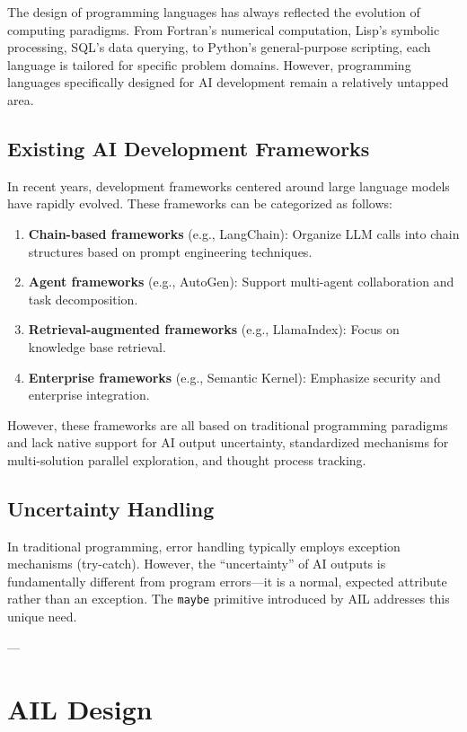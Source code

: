 \documentclass[12pt,a4paper]{article}
\begin{document}
The design of programming languages has always reflected the evolution of computing paradigms. From Fortran's numerical computation, Lisp's symbolic processing, SQL's data querying, to Python's general-purpose scripting, each language is tailored for specific problem domains. However, programming languages specifically designed for AI development remain a relatively untapped area.

\subsection{Existing AI Development Frameworks}

In recent years, development frameworks centered around large language models have rapidly evolved. These frameworks can be categorized as follows:

\begin{enumerate}
\item \textbf{Chain-based frameworks} (e.g., LangChain): Organize LLM calls into chain structures based on prompt engineering techniques.
\item \textbf{Agent frameworks} (e.g., AutoGen): Support multi-agent collaboration and task decomposition.
\item \textbf{Retrieval-augmented frameworks} (e.g., LlamaIndex): Focus on knowledge base retrieval.
\item \textbf{Enterprise frameworks} (e.g., Semantic Kernel): Emphasize security and enterprise integration.
\end{enumerate}

However, these frameworks are all based on traditional programming paradigms and lack native support for AI output uncertainty, standardized mechanisms for multi-solution parallel exploration, and thought process tracking.

\subsection{Uncertainty Handling}

In traditional programming, error handling typically employs exception mechanisms (try-catch). However, the ``uncertainty'' of AI outputs is fundamentally different from program errors—it is a normal, expected attribute rather than an exception. The \texttt{maybe} primitive introduced by AIL addresses this unique need.

---

\section{AIL Design}
\end{document}
